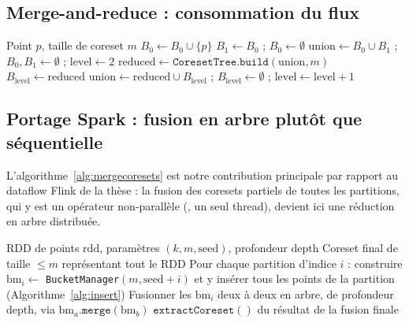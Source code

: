 \subsection{Merge-and-reduce : consommation du flux}

\begin{algorithm}[h]
\caption{ : insertion d'un point (merge-and-reduce)}
\label{alg:insert}
\begin{algorithmic}[1]
\REQUIRE Point $p$, taille de coreset $m$
\STATE $B_0 \leftarrow B_0 \cup \{p\}$
    \STATE $B_1 \leftarrow B_0$ ; $B_0 \leftarrow \emptyset$ 
  \ELSE
    \STATE $\mathrm{union} \leftarrow B_0 \cup B_1$ ; $B_0, B_1 \leftarrow \emptyset$ ; $\mathrm{level} \leftarrow 2$
      \STATE $\mathrm{reduced} \leftarrow \mathtt{CoresetTree.build}(\mathrm{union}, m)$
        \STATE $B_{\mathrm{level}} \leftarrow \mathrm{reduced}$ 
      \ELSE
        \STATE $\mathrm{union} \leftarrow \mathrm{reduced} \cup B_{\mathrm{level}}$ ; $B_{\mathrm{level}} \leftarrow \emptyset$ ; $\mathrm{level} \leftarrow \mathrm{level}+1$
      \ENDIF
    \ENDWHILE
  \ENDIF
\ENDIF
\end{algorithmic}
\end{algorithm}

\subsection{Portage Spark : fusion en arbre plutôt que séquentielle}

L'algorithme~\ref{alg:mergecoresets} est notre contribution principale par
rapport au dataflow Flink de la thèse : la fusion des coresets partiels de
toutes les partitions, qui y est un opérateur non-parallèle
(, un seul thread), devient ici une réduction en
arbre distribuée.

\begin{algorithm}[h]
\caption{ : fusion distribuée en arbre}
\label{alg:mergecoresets}
\begin{algorithmic}[1]
\REQUIRE RDD de points $\mathrm{rdd}$, paramètres $(k,m,\mathrm{seed})$, profondeur $\mathrm{depth}$
\ENSURE Coreset final de taille $\le m$ représentant tout le RDD
\STATE Pour chaque partition d'indice $i$ : construire $\mathrm{bm}_i \leftarrow$ \texttt{BucketManager}$(m, \mathrm{seed}+i)$ et y insérer tous les points de la partition (Algorithme~\ref{alg:insert})
\STATE Fusionner les $\mathrm{bm}_i$ deux à deux en arbre, de profondeur $\mathrm{depth}$, via $\mathrm{bm}_a.\mathtt{merge}(\mathrm{bm}_b)$
\RETURN $\mathtt{extractCoreset}()$ du résultat de la fusion finale
\end{algorithmic}
\end{algorithm}

